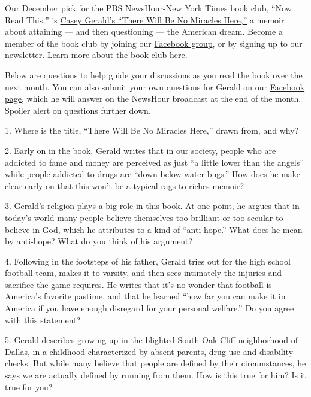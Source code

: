 Our December pick for the PBS NewsHour-New York Times book club, ``Now
Read This,'' is
\href{https://www.nytimes3xbfgragh.onion/2018/10/24/books/review/casey-gerald-memoir-there-will-be-no-miracles-here.html?action=click\&contentCollection=books\&region=rank\&module=package\&version=highlights\&contentPlacement=2\&pgtype=collection}{Casey
Gerald's ``There Will Be No Miracles Here,''} a memoir about attaining
--- and then questioning --- the American dream. Become a member of the
book club by joining our
\href{https://www.facebookcorewwwi.onion/groups/NowReadThisBookClub}{Facebook
group}, or by signing up to our
\href{https://pbs.us1.list-manage.com/subscribe?u=8aa1c620fd96b27384151c36e\&id=2fe6581b35}{newsletter}.
Learn more about the book club
\href{https://www.pbs.org/newshour/arts/what-is-now-read-this}{here}.

Below are questions to help guide your discussions as you read the book
over the next month. You can also submit your own questions for Gerald
on our
\href{https://www.facebookcorewwwi.onion/groups/NowReadThisBookClub}{Facebook
page}, which he will answer on the NewsHour broadcast at the end of the
month. Spoiler alert on questions further down.

1. Where is the title, ``There Will Be No Miracles Here,'' drawn from,
and why?

2. Early on in the book, Gerald writes that in our society, people who
are addicted to fame and money are perceived as just ``a little lower
than the angels'' while people addicted to drugs are ``down below water
bugs.'' How does he make clear early on that this won't be a typical
rags-to-riches memoir?

3. Gerald's religion plays a big role in this book. At one point, he
argues that in today's world many people believe themselves too
brilliant or too secular to believe in God, which he attributes to a
kind of ``anti-hope.'' What does he mean by anti-hope? What do you think
of his argument?

4. Following in the footsteps of his father, Gerald tries out for the
high school football team, makes it to varsity, and then sees intimately
the injuries and sacrifice the game requires. He writes that it's no
wonder that football is America's favorite pastime, and that he learned
``how far you can make it in America if you have enough disregard for
your personal welfare.'' Do you agree with this statement?

5. Gerald describes growing up in the blighted South Oak Cliff
neighborhood of Dallas, in a childhood characterized by absent parents,
drug use and disability checks. But while many believe that people are
defined by their circumstances, he says we are actually defined by
running from them. How is this true for him? Is it true for you?

